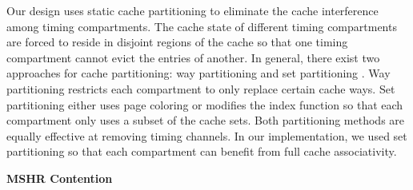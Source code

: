 Our design uses static cache partitioning to eliminate the cache
interference among timing compartments.
The cache state of different timing compartments are forced to reside in 
disjoint regions of the cache so that one timing compartment cannot evict the 
entries of another.
In general, there exist two approaches for cache partitioning:
way partitioning \cite{dynamic_partitioning} and
set partitioning \cite{rtas_cache_framework}. Way partitioning restricts
each compartment to only replace certain cache ways. Set partitioning
either uses page coloring or modifies the index function so that each compartment
only uses a subset of the cache sets. Both partitioning methods are equally
effective at removing timing channels. In our implementation, we used
set partitioning so that each compartment can benefit from full 
cache associativity.





\textbf{MSHR Contention}

